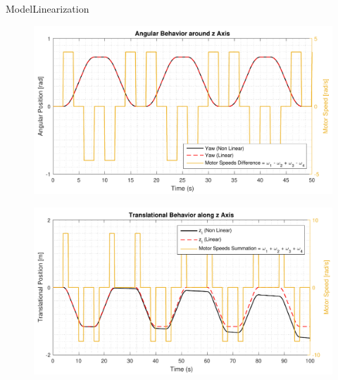 \begin{frame}{Model}{Linearization}
    \begin{minipage}{\linewidth}
        \begin{minipage}{0.5\linewidth}
            \begin{figure}[H]
                \centering
                \includegraphics[width=\textwidth]{figures/yawCompModel}
            \end{figure}            
        \end{minipage}
        \hspace{0.03\linewidth}
        \begin{minipage}{0.5\linewidth}
            \begin{figure}[H]
                \centering
                \includegraphics[width=\textwidth]{figures/zCompModel}
            \end{figure}          
        \end{minipage}        
    \end{minipage}
\end{frame}

